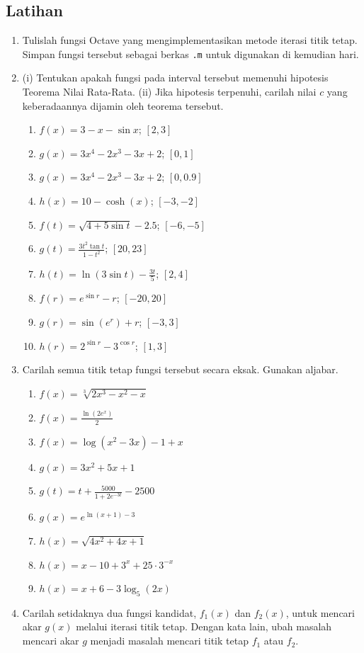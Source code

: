 \subsection{Latihan}
\begin{enumerate}
\item \label{enu:fixedPtIterationCode}Tulislah fungsi Octave yang mengimplementasikan
metode iterasi titik tetap. Simpan fungsi tersebut sebagai berkas
\texttt{.m} untuk digunakan di kemudian hari.
\item \label{enu:mvtExamples}(i) Tentukan apakah fungsi pada interval tersebut
memenuhi hipotesis Teorema Nilai Rata-Rata. (ii) Jika hipotesis terpenuhi,
carilah nilai $c$ yang keberadaannya dijamin oleh teorema tersebut.

\begin{enumerate}
\item $f(x)=3-x-\sin x$; $[2,3]$
\item $g(x)=3x^{4}-2x^{3}-3x+2$; $[0,1]$
\item \label{exc:fixedpt}$g(x)=3x^{4}-2x^{3}-3x+2$; $[0,0.9]$ \hasasolution 
\item \label{exc:fixedpt-16}$h(x)=10-\cosh(x)$; $[-3,-2]$ \hasananswer 
\item $f(t)=\sqrt{4+5\sin t}-2.5$; $[-6,-5]$
\item \label{exc:fixedpt-1}$g(t)=\frac{3t^{2}\tan t}{1-t^{2}}$; $[20,23]$ \hasasolution 
\item \label{exc:fixedpt-2}$h(t)=\ln(3\sin t)-\frac{3t}{5}$; $[2,4]$ \hasananswer 
\item \label{exc:fixedpt-3}$f(r)=e^{\sin r}-r$; $[-20,20]$ \hasananswer 
\item $g(r)=\sin(e^{r})+r$; $[-3,3]$
\item $h(r)=2^{\sin r}-3^{\cos r}$; $[1,3]$
\end{enumerate}
\item Carilah semua titik tetap fungsi tersebut secara eksak. Gunakan aljabar.

\begin{enumerate}
\item $f(x)=\sqrt[3]{2x^{3}-x^{2}-x}$
\item $f(x)=\frac{\ln(2e^{x})}{2}$
\item \label{exc:fixedpt-4}$f(x)=\log(x^{2}-3x)-1+x$ \hasananswer 
\item \label{exc:fixedpt-5}$g(x)=3x^{2}+5x+1$ \hasananswer 
\item $g(t)=t+\frac{5000}{1+2e^{-3t}}-2500$
\item $g(x)=e^{\ln(x+1)-3}$
\item $h(x)=\sqrt{4x^{2}+4x+1}$
\item \label{exc:fixedpt-6}$h(x)=x-10+3^{x}+25\cdot3^{-x}$ \hasasolution 
\item $h(x)=x+6-3\log_{5}(2x)$
\end{enumerate}
\item Carilah setidaknya dua fungsi kandidat, $f_{1}(x)$ dan $f_{2}(x)$,
untuk mencari akar $g(x)$ melalui iterasi titik tetap. Dengan kata
lain, ubah masalah mencari akar $g$ menjadi masalah mencari titik
tetap $f_{1}$ atau $f_{2}$.


\end{enumerate}
